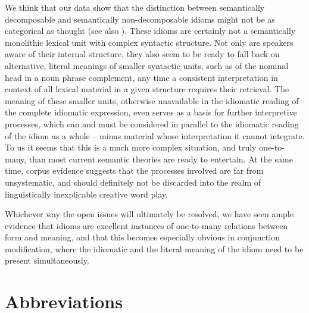 \documentclass[output=paper]{langsci/langscibook}
\begin{document}
We think that our data show that the distinction between semantically decomposable and semantically non-decomposable idioms might not be as categorical as \cite{Nunberg:al:94} thought (see also \citealt{bargmannsailerta}). These idioms are certainly not a semantically monolithic lexical unit with complex syntactic structure. Not only are speakers aware of their internal structure, they also seem to be ready to fall back on alternative, literal meanings of smaller syntactic units, such as of the nominal head in a noun phrase complement, any time a consistent interpretation in context of all lexical material in a given structure requires their retrieval. The meaning of these smaller units, otherwise unavailable in the idiomatic reading of the complete idiomatic expression, even serves as a basis for further interpretive processes, which can and must be considered in parallel to the idiomatic reading of the idiom as a whole -- minus material whose interpretation it cannot integrate. To us it seems that this is a much more complex situation, and truly one-to-many, than most current semantic theories are ready to entertain. At the same time, corpus evidence suggests that the processes involved are far from unsystematic, and should definitely not be discarded into the realm of linguistically inexplicable creative word play.

Whichever way the open issues will ultimately be resolved, we have seen ample evidence that idioms are excellent instances of one-to-many relations between form and meaning, and that this becomes especially obvious in conjunction modification, where the idiomatic and the literal meaning of the idiom need to be present simultaneously.



\section*{Abbreviations}
\end{document}
